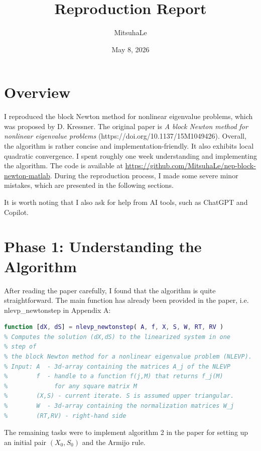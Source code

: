 \documentclass[11pt,a4paper]{article}
\title{Reproduction Report}
\author{MitsuhaLe}
\date{May 8, 2026}
\begin{document}
\maketitle

\section{Overview}

I reproduced the block Newton method for nonlinear eigenvalue problems,
which was proposed by D. Kressner. The original paper is \emph{A block Newton method for nonlinear eigenvalue problems} (https://doi.org/10.1137/15M1049426). 
Overall, the algorithm is rather concise and implementation-friendly. It also exhibits local quadratic convergence.
I spent roughly one week understanding and implementing the algorithm. The code is available at \url{https://github.com/MitsuhaLe/nep-block-newton-matlab}.
During the reproduction process, I made some severe minor mistakes, which are presented in the following sections. 

It is worth noting that I also ask for help from AI tools, such as ChatGPT and Copilot.

\section{Phase 1: Understanding the Algorithm}
After reading the paper carefully, I found that the algorithm is quite straightforward. The main function has already been provided in the paper, i.e. nlevp\_newtonstep in Appendix A:

\begin{lstlisting}[language=Matlab,caption={nlevp\_newtonstep function from the original paper.},label={lst:nlevp_newtonstep}]
function [dX, dS] = nlevp_newtonstep( A, f, X, S, W, RT, RV )
% Computes the solution (dX,dS) to the linearized system in one 
% step of
% the block Newton method for a nonlinear eigenvalue problem (NLEVP).
% Input: A  - 3d-array containing the matrices A_j of the NLEVP
%        f  - handle to a function f(j,M) that returns f_j(M)
%             for any square matrix M
%        (X,S) - current iterate. S is assumed upper triangular.
%        W  - 3d-array containing the normalization matrices W_j
%        (RT,RV) - right-hand side
\end{lstlisting}

The remaining tasks were to implement algorithm 2 in the paper for setting up an initial pair $(X_0, S_0)$  
and the Armijo rule.
\end{document}
